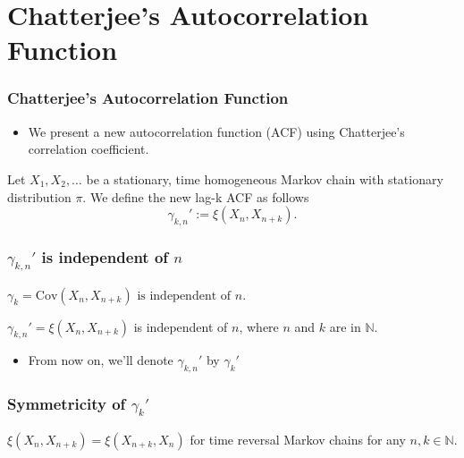 \documentclass [xcolor=svgnames, t] {beamer}
\begin{document}
\section{Chatterjee's Autocorrelation Function}
\begin{frame}
    \frametitle{Chatterjee's Autocorrelation Function}
    \begin{itemize}
        \item We present a new autocorrelation function (ACF) using Chatterjee's correlation coefficient.
    \end{itemize}
    \vspace{2em}
    \begin{definition}
        Let $X_1, X_2, \dots$ be a stationary, time homogeneous Markov chain with stationary distribution $\pi$.
        We define the new lag-k ACF as follows
        $$\gamma_{k, n}' := \xi(X_n, X_{n+k}).$$
    \end{definition}

\end{frame}

\begin{frame}
    \frametitle{$\gamma_{k, n}'$ is independent of $n$}
    \vspace{1em}
    \begin{theorem}
        $\gamma_k = \text{Cov}(X_n, X_{n+k}) \text{ is independent of } n.$
    \end{theorem}
    \vspace{2em}
    \begin{theorem}
        $\gamma_{k, n}' = \xi(X_n, X_{n+k})$ is independent of $n$, where $n$ and $k$ are in $\mathbb{N}$.
    \end{theorem}
    \vspace{2em}
    \begin{itemize}
        \item From now on, we'll denote $\gamma_{k, n}'$ by $\gamma_{k}'$
    \end{itemize}
\end{frame}

\begin{frame}
    \frametitle{Symmetricity of $\gamma_k'$}
    \vspace{5.5em}
    \begin{theorem}
        $\xi(X_n, X_{n+k}) = \xi(X_{n+k}, X_n)$ for time reversal Markov chains for any $n, k \in \mathbb{N}$.
    \end{theorem}

\end{frame}
\end{document}
